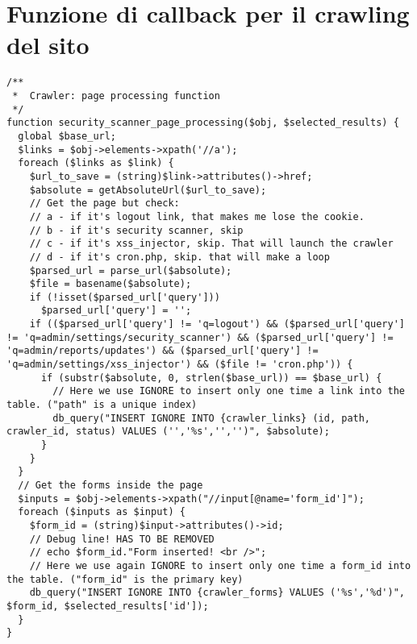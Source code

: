 \section{Funzione di callback per il crawling del sito}
\begin{lstlisting}
/**
 *  Crawler: page processing function
 */     
function security_scanner_page_processing($obj, $selected_results) {
  global $base_url;
  $links = $obj->elements->xpath('//a');
  foreach ($links as $link) {
    $url_to_save = (string)$link->attributes()->href;
    $absolute = getAbsoluteUrl($url_to_save);
    // Get the page but check:
    // a - if it's logout link, that makes me lose the cookie.
    // b - if it's security scanner, skip
    // c - if it's xss_injector, skip. That will launch the crawler
    // d - if it's cron.php, skip. that will make a loop
    $parsed_url = parse_url($absolute);
    $file = basename($absolute);
    if (!isset($parsed_url['query']))
      $parsed_url['query'] = '';
    if (($parsed_url['query'] != 'q=logout') && ($parsed_url['query'] != 'q=admin/settings/security_scanner') && ($parsed_url['query'] != 'q=admin/reports/updates') && ($parsed_url['query'] != 'q=admin/settings/xss_injector') && ($file != 'cron.php')) {  
      if (substr($absolute, 0, strlen($base_url)) == $base_url) {
        // Here we use IGNORE to insert only one time a link into the table. ("path" is a unique index)
        db_query("INSERT IGNORE INTO {crawler_links} (id, path, crawler_id, status) VALUES ('','%s','','')", $absolute);
      }
    }
  }
  // Get the forms inside the page
  $inputs = $obj->elements->xpath("//input[@name='form_id']");
  foreach ($inputs as $input) {
    $form_id = (string)$input->attributes()->id;
    // Debug line! HAS TO BE REMOVED
    // echo $form_id."Form inserted! <br />";
    // Here we use again IGNORE to insert only one time a form_id into the table. ("form_id" is the primary key)
    db_query("INSERT IGNORE INTO {crawler_forms} VALUES ('%s','%d')", $form_id, $selected_results['id']);
  }
}
\end{lstlisting}
